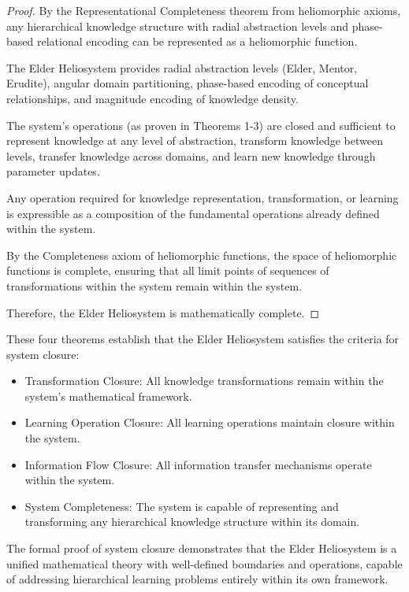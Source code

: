 \begin{proof}
By the Representational Completeness theorem from heliomorphic axioms, any hierarchical knowledge structure with radial abstraction levels and phase-based relational encoding can be represented as a heliomorphic function.

The Elder Heliosystem provides radial abstraction levels (Elder, Mentor, Erudite), angular domain partitioning, phase-based encoding of conceptual relationships, and magnitude encoding of knowledge density.

The system's operations (as proven in Theorems 1-3) are closed and sufficient to represent knowledge at any level of abstraction, transform knowledge between levels, transfer knowledge across domains, and learn new knowledge through parameter updates.

Any operation required for knowledge representation, transformation, or learning is expressible as a composition of the fundamental operations already defined within the system.

By the Completeness axiom of heliomorphic functions, the space of heliomorphic functions is complete, ensuring that all limit points of sequences of transformations within the system remain within the system.

Therefore, the Elder Heliosystem is mathematically complete.
\end{proof}

These four theorems establish that the Elder Heliosystem satisfies the criteria for system closure:
\begin{itemize}
    \item Transformation Closure: All knowledge transformations remain within the system's mathematical framework.
    \item Learning Operation Closure: All learning operations maintain closure within the system.
    \item Information Flow Closure: All information transfer mechanisms operate within the system.
    \item System Completeness: The system is capable of representing and transforming any hierarchical knowledge structure within its domain.
\end{itemize}

The formal proof of system closure demonstrates that the Elder Heliosystem is a unified mathematical theory with well-defined boundaries and operations, capable of addressing hierarchical learning problems entirely within its own framework.

